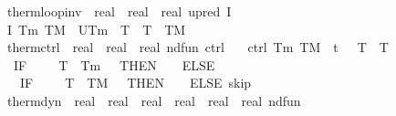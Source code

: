 \documentclass[envcountsame,envcountsect]{llncs}
\begin{document}
\begin{example}
\begin{isabellebody}
\isanewline
{}
\isamarkupfalse%
\ therm{\isacharunderscore}loop{\isacharunderscore}inv\ {\isacharcolon}{\isacharcolon}\ {\isachardoublequoteopen}real\ {\isasymRightarrow}\ real\ {\isasymRightarrow}\ {\isacharparenleft}real{\isacharcircum}{}{\isacharparenright}\ upred{\isachardoublequoteclose}\ {\isacharparenleft}{\isachardoublequoteopen}I{\isachardoublequoteclose}{\isacharparenright}\isanewline
\  
\ {\isachardoublequoteopen}I\ T\isactrlsub m\ T\isactrlsub M\ {\isasymequiv}\ U{\isacharparenleft}T\isactrlsub m\ {\isasymle}\ T\ {\isasymand}\ T\ {\isasymle}\ T\isactrlsub M\ {\isasymand}\ {\isacharparenleft}{\isasymtheta}\ {\isacharequal}\ {}\ {\isasymor}\ {\isasymtheta}\ {\isacharequal}\ {}{\isacharparenright}{\isacharparenright}{\isachardoublequoteclose}\isanewline
\isanewline
{}\isamarkupfalse%
\ therm{\isacharunderscore}ctrl\ {\isacharcolon}{\isacharcolon}\ {\isachardoublequoteopen}real\ {\isasymRightarrow}\ real\ {\isasymRightarrow}\ {\isacharparenleft}real{\isacharcircum}{}{\isacharparenright}\ nd{\isacharunderscore}fun{\isachardoublequoteclose}\ {\isacharparenleft}{\isachardoublequoteopen}ctrl{\isachardoublequoteclose}{\isacharparenright}\isanewline
\ \ \ {\isachardoublequoteopen}ctrl\ T\isactrlsub m\ T\isactrlsub M\ {\isasymequiv}\ {\isacharparenleft}t\ {\isacharcolon}{\isacharcolon}{\isacharequal}\ {}{\isacharparenright}{\isacharsemicolon}\ {\isacharparenleft}T\ {\isacharcolon}{\isacharcolon}{\isacharequal}\ T{\isacharparenright}{\isacharsemicolon}\isanewline
\ \ {\isacharparenleft}IF\ {\isacharparenleft}{\isasymtheta}\ {\isacharequal}\ {}\ {\isasymand}\ T\ {\isasymle}\ T\isactrlsub m\ {\isacharplus}\ {}{\isacharparenright}\ THEN\ {\isacharparenleft}{\isasymtheta}\ {\isacharcolon}{\isacharcolon}{\isacharequal}\ {}{\isacharparenright}\ ELSE\ \isanewline
\ \ \ IF\ {\isacharparenleft}{\isasymtheta}\ {\isacharequal}\ {}\ {\isasymand}\ T\ {\isasymge}\ T\isactrlsub M\ {\isacharminus}\ {}{\isacharparenright}\ THEN\ {\isacharparenleft}{\isasymtheta}\ {\isacharcolon}{\isacharcolon}{\isacharequal}\ {}{\isacharparenright}\ ELSE\ skip{\isacharparenright}{\isachardoublequoteclose}\isanewline
\isanewline
{}\isamarkupfalse%
\ therm{\isacharunderscore}dyn\ {\isacharcolon}{\isacharcolon}\ {\isachardoublequoteopen}real\ {\isasymRightarrow}\ real\ {\isasymRightarrow}\ real\ {\isasymRightarrow}\ real\ {\isasymRightarrow}\ real\ {\isasymRightarrow}\ {\isacharparenleft}real{\isacharcircum}{}{\isacharparenright}\ nd{\isacharunderscore}fun{\isachardoublequoteclose}\isanewline

\end{isabellebody}
\end{example}
\end{document}
